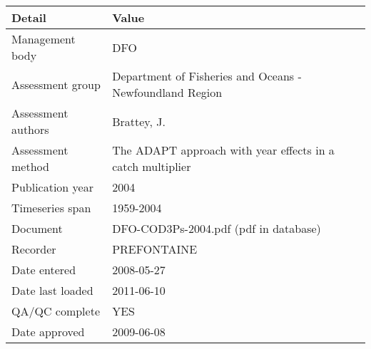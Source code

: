 \begin{table}[htb]
\centering
\begin{tabular}{lp{7cm}}
\toprule
Detail & Value \\
\midrule
Management body    & DFO                                                        \\
Assessment group   & Department of Fisheries and Oceans - Newfoundland Region   \\
Assessment authors & Brattey, J.                                                \\
Assessment method  & The ADAPT approach with year effects in a catch multiplier \\
Publication year   & 2004                                                       \\
Timeseries span    & 1959-2004                                                  \\
Document           & DFO-COD3Ps-2004.pdf (pdf in database)                      \\
Recorder           & PREFONTAINE                                                \\
Date entered       & 2008-05-27                                                 \\
Date last loaded   & 2011-06-10                                                 \\
QA/QC complete     & YES                                                        \\
Date approved      & 2009-06-08                                                 \\
\bottomrule
\end{tabular}
\label{tab:assessdet}
\end{table}
